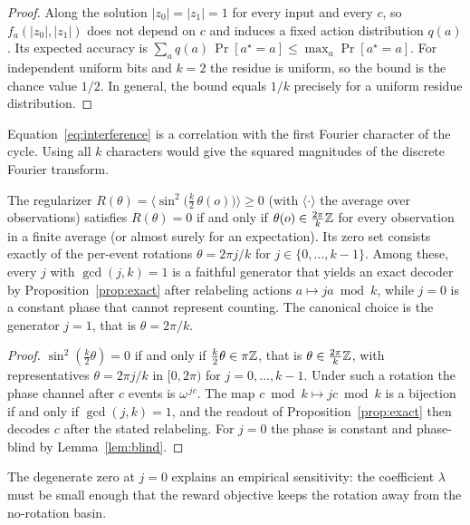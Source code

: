 \begin{proof}
Along the solution $|z_0|=|z_1|=1$ for every input and every $c$, so $f_a(|z_0|,|z_1|)$ does not
depend on $c$ and induces a fixed action distribution $q(a)$. Its expected accuracy is
$\sum_a q(a)\,\Pr[a^\star=a]\le \max_a \Pr[a^\star=a]$. For independent uniform bits and $k=2$ the
residue is uniform, so the bound is the chance value $1/2$. In general, the bound equals $1/k$ precisely for a uniform residue distribution.
\end{proof}

Equation~\eqref{eq:interference} is a correlation with the first Fourier
character of the cycle. Using all $k$ characters would give the squared
magnitudes of the discrete Fourier transform.

\begin{proposition}
\label{prop:reg}
The regularizer $R(\theta)=\big\langle\sin^2\!\big(\tfrac{k}{2}\,\theta(o)\big)\big\rangle\ge 0$
(with $\langle\cdot\rangle$ the average over observations) satisfies $R(\theta)=0$ if and only if
$\theta(o)\in\tfrac{2\pi}{k}\mathbb{Z}$ for every observation in a finite average (or almost surely for an expectation). Its zero set consists exactly of the
per-event rotations $\theta=2\pi j/k$ for $j\in\{0,\dots,k-1\}$. Among these, every $j$ with
$\gcd(j,k)=1$ is a faithful generator that yields an exact decoder by Proposition~\ref{prop:exact}
after relabeling actions $a\mapsto ja\bmod k$, while $j=0$ is a constant phase that cannot represent
counting. The canonical choice is the generator $j=1$, that is $\theta=2\pi/k$.
\end{proposition}

\begin{proof}
$\sin^2(\tfrac{k}{2}\theta)=0$ if and only if $\tfrac{k}{2}\theta\in\pi\mathbb{Z}$, that is
$\theta\in\tfrac{2\pi}{k}\mathbb{Z}$, with representatives $\theta=2\pi j/k$ in $[0,2\pi)$ for
$j=0,\dots,k-1$. Under such a rotation the phase channel after $c$ events is $\omega^{\,jc}$. The
map $c\bmod k\mapsto jc\bmod k$ is a bijection if and only if $\gcd(j,k)=1$, and the readout of
Proposition~\ref{prop:exact} then decodes $c$ after the stated relabeling. For $j=0$ the phase
is constant and phase-blind by Lemma~\ref{lem:blind}.
\end{proof}

The degenerate zero at $j=0$ explains an empirical sensitivity: the coefficient $\lambda$ must be
small enough that the reward objective keeps the rotation away from the no-rotation basin.

